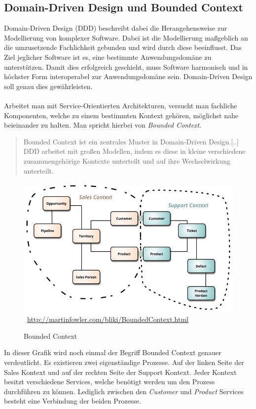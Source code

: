 \subsection{Domain-Driven Design und Bounded Context}
\label{sec:boundedContext}
Domain-Driven Design (DDD) beschreibt dabei die Herangehensweise zur Modellierung von komplexer Software. Dabei ist die Modellierung maßgeblich an die umzusetzende Fachlichkeit gebunden und wird durch diese beeinflusst. Das Ziel jeglicher Software ist es, eine bestimmte Anwendungsdomäne zu unterstützen. Damit dies erfolgreich geschieht, muss Software harmonisch und in höchster Form interoperabel zur Anwendungsdomäne sein. Domain-Driven Design soll genau dies gewährleisten.
\\\\
Arbeitet man mit Service-Orientierten Architekturen, versucht man fachliche Komponenten, welche zu einem bestimmten Kontext gehören, möglichst nahe beieinander zu halten. Man spricht hierbei von \textit{Bounded Context}. 
\begin{quotation}
    \frqq Bounded Context ist ein zentrales Muster in Domain-Driven Design.[..] DDD arbeitet mit großen Modellen, indem es diese in kleine verschiedene zusammengehörige Kontexte unterteilt und auf ihre Wechselwirkung unterteilt.\flqq \cite{mfowler:BoundedContext}
\end{quotation}

\begin{figure}[htb]
    \centering 
    \includegraphics[width=\linewidth]{content/images/BoundedContext}\
    \quelle\url{http://martinfowler.com/bliki/BoundedContext.html}
    \caption[Bounded Context]{Bounded Context\\}
    \label{fig:BoundedContext}  
\end{figure} 
In dieser Grafik wird noch einmal der Begriff Bounded Context genauer verdeutlicht. Es existieren zwei eigenständige Prozesse. Auf der linken Seite der Sales Kontext und auf der rechten Seite der Support Kontext. Jeder Kontext besitzt verschiedene Services, welche benötigt werden um den Prozess durchführen zu können. Lediglich zwischen den \textit{Customer} und \textit{Product} Services besteht eine Verbindung der beiden Prozesse.


